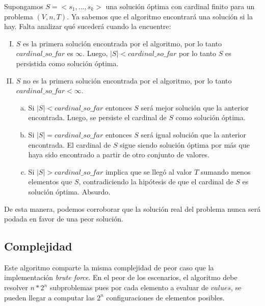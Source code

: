 \vskip 8pt

Supongamos $S=<s_{1}, ..., s_{k}>$ una solución óptima con cardinal finito para un problema $(V, n, T)$. Ya sabemos que el algoritmo encontrará una solución si la hay. Falta analizar qué sucederá cuando la encuentre:

\begin{enumerate}[I)]
	\item $S$ es la primera solución encontrada por el algoritmo, por lo tanto $cardinal\_so\_far$ es $\infty$. Luego, $|S| < cardinal\_so\_far$ por lo tanto $S$ es persistida como solución óptima.
	\item $S$ no es la primera solución encontrada por el algoritmo, por lo tanto $cardinal\_so\_far < \infty$.
	\begin{enumerate}[a)]
		\item Si $|S| < cardinal\_so\_far$ entonces $S$ será mejor solución que la anterior encontrada. Luego, se persiste el cardinal de $S$ como solución óptima.
		\item Si $|S| = cardinal\_so\_far$ entonces $S$ será igual solución que la anterior encontrada. El cardinal de $S$ sigue siendo solución óptima por más que haya sido encontrado a partir de otro conjunto de valores.
		\item Si $|S| > cardinal\_so\_far$ implica que se llegó al valor $T$ sumando menos elementos que $S$, contradiciendo la hipótesis de que el cardinal de $S$ es solución óptima. Absurdo.
	\end{enumerate}
\end{enumerate}

De esta manera, podemos corroborar que la solución real del problema nunca será podada en favor de una peor solución.

\subsection{Complejidad}
Este algoritmo comparte la misma complejidad de peor caso que la implementación \textit{brute force}. En el peor de los escenarios, el algoritmo debe resolver $n*2^n$ subproblemas pues por cada elemento a evaluar de $values$, se pueden llegar a computar las $2^n$ configuraciones de elementos posibles.